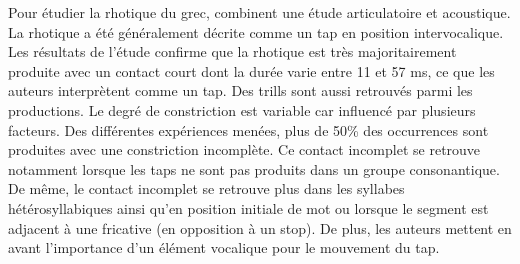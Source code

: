 Pour étudier la rhotique du grec, \textcite{baltazaniManyFaces2013} combinent une étude articulatoire et acoustique. La rhotique a été généralement décrite comme un tap en position intervocalique. Les résultats de l'étude confirme que la rhotique est très majoritairement produite avec un contact court dont la durée varie entre 11 et 57 ms, ce que les auteurs interprètent comme un tap. Des trills sont aussi retrouvés parmi les productions. Le degré de constriction est variable car influencé par plusieurs facteurs. Des différentes expériences menées, plus de 50\% des occurrences sont produites avec une constriction incomplète. Ce contact incomplet se retrouve notamment lorsque les taps ne sont pas produits dans un groupe consonantique. De même, le contact incomplet se retrouve plus dans les syllabes hétérosyllabiques ainsi qu'en position initiale de mot ou lorsque le segment est adjacent à une fricative (en opposition à un stop). De plus, les auteurs mettent en avant l'importance d'un élément vocalique pour le mouvement du tap.





